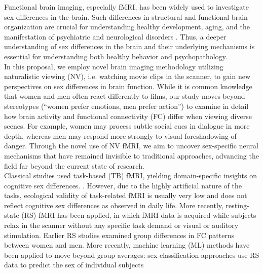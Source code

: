 \documentclass[11pt,a4paper]{article}
\begin{document}
Functional brain imaging, especially fMRI, has been widely used to investigate sex differences in the brain. 
Such differences in structural and functional brain organization are crucial for understanding healthy development, 
aging, and the manifestation of psychiatric and neurological disorders \parencite{cahillWhySexMatters2006,gobinathSexHormonesGenotype2017}. 
Thus, a deeper understanding of sex differences in the brain and their underlying mechanisms is essential 
for understanding both healthy behavior and psychopathology.\\
In this proposal, we employ novel brain imaging methodology utilizing naturalistic viewing (NV), i.e. watching movie 
clips in the scanner, to gain new perspectives on sex differences in brain function. While it is common knowledge 
that women and men often react differently to films, our study moves beyond stereotypes (“women prefer emotions, 
men prefer action”) to examine in detail how brain activity and functional connectivity (FC) differ when 
viewing diverse scenes. For example, women may process subtle social cues in dialogue in more depth, whereas 
men may respond more strongly to visual foreshadowing of danger. Through the novel use of NV fMRI, we aim to uncover 
sex-specific neural mechanisms that have remained invisible to traditional approaches, advancing the field far beyond 
the current state of research.\\
Classical studies used task-based (TB) fMRI, yielding domain-specific insights on cognitive sex differences. 
\parencite{thimmMenstrualCycleEffects2014a,weisDynamicChangesFunctional2011,weisEstradiolModulatesFunctional2008}. 
However, due to the highly artificial nature of the tasks, ecological validity of task-related fMRI is usually 
very low and does not reflect cognitive sex differences as observed in daily life.
More recently, resting-state (RS) fMRI has been applied, in which fMRI data is acquired while subjects relax 
in the scanner without any specific task demand or visual or auditory stimulation.
Earlier RS studies examined group differences in FC patterns between women and men. 
More recently, machine learning (ML) methods have been applied to move beyond group averages: 
sex classification approaches use RS data to predict the sex of individual subjects 
\end{document}
